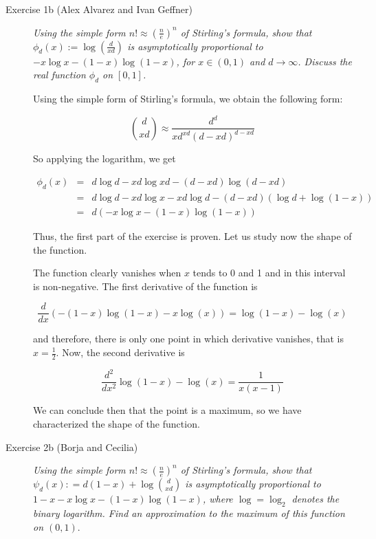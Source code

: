 \begin{description}
\item[Exercise 1b (Alex Alvarez and Ivan Geffner)] \textit{Using the simple form $n! \approx \left(\frac{n}{e}\right)^n$ of Stirling's formula, show that $\phi_d(x) := \log\left(\frac{d}{xd}\right)$ is asymptotically proportional to $-x\log x - (1 - x)\log(1 - x)$, for $x\in (0,1)$ and $d \rightarrow \infty$. Discuss the real function $\phi_d$ on $[0,1]$.}

\bigskip
Using the simple form of Stirling's formula, we obtain the following form:

\begin{equation*}
{d \choose xd} \approx \frac{d^d}{xd^{xd}(d - xd)^{d - xd}}
\end{equation*}

So applying the logarithm, we get

\begin{eqnarray*}
\phi_d(x) &=& d\log d - xd\log xd - (d - xd)\log (d - xd) \\
&=& d\log d - xd\log x - xd\log d - (d - xd)(\log d + \log (1 - x)) \\
&=& d(-x\log x - (1 - x)\log (1 - x))
\end{eqnarray*}

Thus, the first part of the exercise is proven. Let us study now the shape of the function. 

The function clearly vanishes when $x$ tends to 0 and 1 and in this interval is non-negative. The first derivative of the function is

\begin{equation*}
\frac{d}{dx}(-(1-x) \log(1-x)-x \log(x)) = \log(1-x)-\log(x)
\end{equation*}

and therefore, there is only one point in which derivative vanishes, that is $x = \frac{1}{2}$. Now, the second derivative is 

\begin{equation*}
\frac{d^2}{dx^2}\log(1-x)-\log(x) = \frac{1}{x(x - 1)}
\end{equation*}

We can conclude then that the point is a maximum, so we have characterized the shape of the function.

\item[Exercise 2b (Borja and Cecilia)] \textit{Using the simple form $n!\approx \left(\frac{n}{e}\right)^n$ of Stirling's formula, show that $\psi_d(x) : = d(1-x)+ \log  \binom {d} {xd}$ is asymptotically proportional to $1-x-x\log x - (1-x)\log(1-x)$, where  $\log = \log_2$ denotes the binary logarithm. Find an approximation to the maximum of this function on $(0,1)$}.


\end{description}
